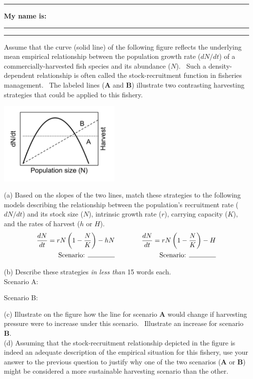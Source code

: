 \documentclass{article}
\newcommand{\ind}{\-\hspace{1cm}}
\newcommand*{\blanks}[1][4em]{\rule{#1}{.4pt}}
\begin{document}
\noindent{}

\rule[0.5ex]{\linewidth}{1pt}
\begin{center}
	\textbf{My name is:} \blanks[150pt]
\end{center}
\rule[0.5ex]{\linewidth}{1pt}

Assume that the curve (solid line) of the following figure reflects the underlying mean empirical relationship between the population growth rate ($dN/dt$) of a commercially-harvested fish species and its abundance ($N$).  Such a density-dependent relationship is often called the stock-recruitment function in fisheries management.  The labeled lines (\textbf{A} and \textbf{B}) illustrate two contrasting harvesting strategies that could be applied to this fishery.
\begin{center}
\includegraphics[width=6cm]{figs/image}\\
\end{center}
(a) Based on the slopes of the two lines, match these strategies to the following models describing the relationship between the population's recruitment rate ($dN/dt$) and its stock size ($N$), intrinsic growth rate ($r$), carrying capacity ($K$), and the rates of harvest ($h$ or $H$).
\begin{align*}
	\frac{dN}{dt}=rN \left(1-\frac{N}{K}\right)-hN &\quad \quad \quad &   \frac{dN}{dt}=rN \left(1-\frac{N}{K}\right)-H \\
	\text{Scenario: }\blanks & \quad \quad \quad & \text{Scenario: }\blanks
\end{align*}

\vspace{1cm}

(b) Describe these strategies \emph{in less than} 15 words each.\\
\ind Scenario A:\\
\vspace{1cm}

\ind Scenario B:\\
\vspace{1cm}

(c) Illustrate on the figure how the line for scenario \textbf{A} would change if harvesting pressure were to increase under this scenario.  Illustrate an increase for scenario \textbf{B}. \\

(d) Assuming that the stock-recruitment relationship depicted in the figure is indeed an adequate description of the empirical situation for this fishery, use your answer to the previous question to justify why one of the two scenarios (\textbf{A} or \textbf{B}) might be considered a more sustainable harvesting scenario than the other. 
\end{document}

